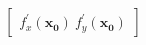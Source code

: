 \documentclass[preview]{standalone}
\begin{document}
\begin{align*}
\begin{bmatrix} f_x^{\prime}(\mathbf{x_0})\ f_y^{\prime}(\mathbf{x_0}) \end{bmatrix}
\end{align*}
\end{document}
